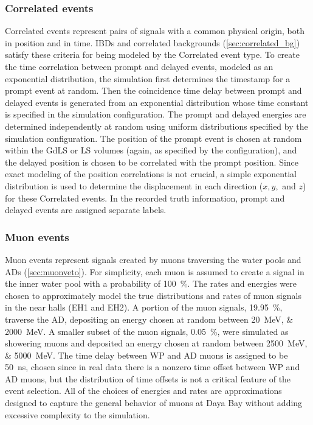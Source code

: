 \subsubsection{Correlated events}

Correlated events represent pairs of signals
with a common physical origin, both in position and in time.
IBDs and correlated backgrounds (\cref{sec:correlated_bg})
satisfy these criteria for being modeled by the Correlated event type.
To create the time correlation between prompt and delayed events,
modeled as an exponential distribution,
the simulation first determines the timestamp for a prompt event at random.
Then the coincidence time delay between prompt and delayed events is generated
from an exponential distribution
whose time constant is specified in the simulation configuration.
The prompt and delayed energies are determined independently at random
using uniform distributions specified by the simulation configuration.
The position of the prompt event is chosen at random
within the GdLS or LS volumes (again, as specified by the configuration),
and the delayed position is chosen to be correlated with the prompt position.
Since exact modeling of the position correlations is not crucial,
a simple exponential distribution is used to determine the displacement
in each direction ($x,y,$ and $z$) for these Correlated events.
In the recorded truth information,
prompt and delayed events are assigned separate labels.

\subsubsection{Muon events}

Muon events represent signals created by muons traversing
the water pools and ADs (\cref{sec:muonveto}).
For simplicity, each muon is assumed to create a signal
in the inner water pool with a probability of \SI{100}{\percent}.
The rates and energies were chosen to approximately model
the true distributions and rates of muon signals in the near halls (EH1 and EH2).
A portion of the muon signals, \SI{19.95}{\percent},
traverse the AD, depositing an energy chosen at random between
\SIlist{20;2000}{\MeV}.
A smaller subset of the muon signals, \SI{0.05}{\percent},
were simulated as showering muons and deposited an energy chosen at random between
\SIlist{2500;5000}{\MeV}.
The time delay between WP and AD muons is assigned to be \SI{50}{\ns},
chosen since in real data there is a nonzero time offset between WP and AD muons,
but the distribution of time offsets
is not a critical feature of the event selection.
All of the choices of energies and rates are approximations
designed to capture the general behavior of muons at Daya Bay
without adding excessive complexity to the simulation.

